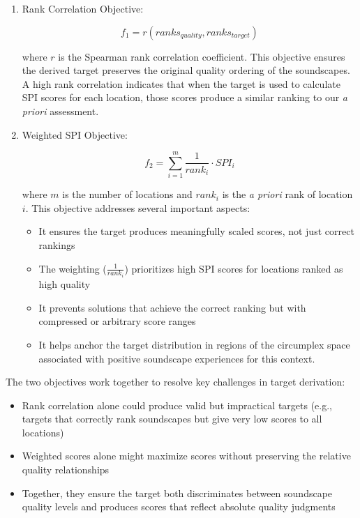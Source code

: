 \documentclass[
  authoryear,
  preprint,
  3p]{elsarticle}
\providecommand{\tightlist}{%
  \setlength{\itemsep}{0pt}\setlength{\parskip}{0pt}}\usepackage{longtable,booktabs,array}
\begin{document}
\begin{enumerate}
\def\labelenumi{\arabic{enumi}.}
\item
  Rank Correlation Objective:

  \[
   f_1 = r(ranks_{quality}, ranks_{target})
   \]

  where \(r\) is the Spearman rank correlation coefficient. This
  objective ensures the derived target preserves the original quality
  ordering of the soundscapes. A high rank correlation indicates that
  when the target is used to calculate SPI scores for each location,
  those scores produce a similar ranking to our \emph{a priori}
  assessment.
\item
  Weighted SPI Objective:

  \[
   f_2 = \sum_{i=1}^{m} \frac{1}{rank_i} \cdot SPI_i
   \]

  where \(m\) is the number of locations and \(rank_i\) is the \emph{a
  priori} rank of location \(i\). This objective addresses several
  important aspects:

  \begin{itemize}
  \tightlist
  \item
    It ensures the target produces meaningfully scaled scores, not just
    correct rankings
  \item
    The weighting (\(\frac{1}{rank_i}\)) prioritizes high SPI scores for
    locations ranked as high quality
  \item
    It prevents solutions that achieve the correct ranking but with
    compressed or arbitrary score ranges
  \item
    It helps anchor the target distribution in regions of the circumplex
    space associated with positive soundscape experiences for this
    context.
  \end{itemize}
\end{enumerate}

The two objectives work together to resolve key challenges in target
derivation:

\begin{itemize}
\tightlist
\item
  Rank correlation alone could produce valid but impractical targets
  (e.g., targets that correctly rank soundscapes but give very low
  scores to all locations)
\item
  Weighted scores alone might maximize scores without preserving the
  relative quality relationships
\item
  Together, they ensure the target both discriminates between soundscape
  quality levels and produces scores that reflect absolute quality
  judgments
\end{itemize}
\end{document}
